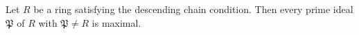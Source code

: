 Let $R$ be a ring satisfying the descending chain condition. Then every prime ideal $\mathfrak{P}$ of $R$ with $\mathfrak{P} \neq R$ is maximal.
